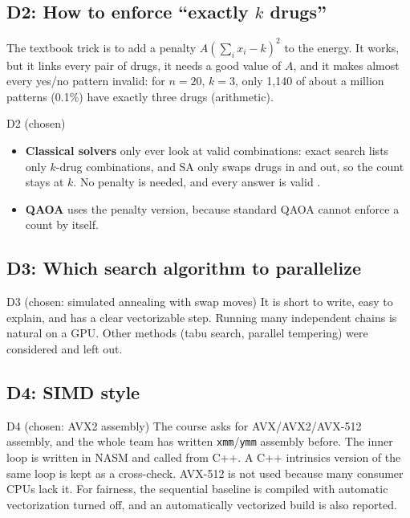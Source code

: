 \subsection{D2: How to enforce ``exactly $k$ drugs''}

The textbook trick is to add a penalty $A(\sum_i x_i-k)^2$ to the energy. It works, but it links every pair of drugs, it needs a good value of $A$, and it makes almost every yes/no pattern invalid: for $n=20$, $k=3$, only 1{,}140 of about a million patterns (0.1\%) have exactly three drugs \established{} (arithmetic).

\begin{decision}{D2 (chosen)}
\begin{itemize}[leftmargin=*]
\item \textbf{Classical solvers} only ever look at valid combinations: exact search lists only $k$-drug combinations, and SA only swaps drugs in and out, so the count stays at $k$. No penalty is needed, and every answer is valid \proposed.
\item \textbf{QAOA} uses the penalty version, because standard QAOA cannot enforce a count by itself.
\end{itemize}
\end{decision}

\subsection{D3: Which search algorithm to parallelize}

\begin{decision}{D3 (chosen: simulated annealing with swap moves)}
It is short to write, easy to explain, and has a clear vectorizable step. Running many independent chains is natural on a GPU. Other methods (tabu search, parallel tempering) were considered and left out.
\end{decision}

\subsection{D4: SIMD style}

\begin{decision}{D4 (chosen: AVX2 assembly)}
The course asks for AVX/AVX2/AVX-512 assembly, and the whole team has written \texttt{xmm}/\texttt{ymm} assembly before. The inner loop is written in NASM and called from C++. A C++ intrinsics version of the same loop is kept as a cross-check. AVX-512 is not used because many consumer CPUs lack it. For fairness, the sequential baseline is compiled with automatic vectorization turned off, and an automatically vectorized build is also reported.
\end{decision}

